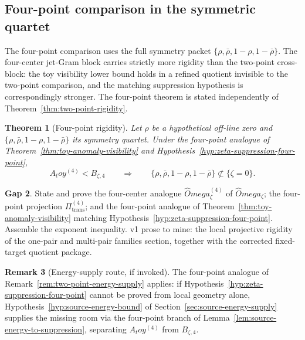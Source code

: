 \documentclass[11pt,a4paper]{amsart}
\def\Omega{Omega}%
\def\toy{toy}%
\numberwithin{equation}{section}
\theoremstyle{plain}
\newtheorem{theorem}{Theorem}[section]
\theoremstyle{definition}
\newtheorem{remark}[theorem]{Remark}
\newcommand{\z}{\zeta}
\newcommand{\Om}{\Omega}
\newcommand{\toy}{\mathrm{toy}}
\newcommand{\trans}{\mathrm{trans}}
\newtheorem{wip}[theorem]{Gap}
\begin{document}
\subsection{Four-point comparison in the symmetric quartet}
\label{subsec:four-point-comparison-symmetric-quartet}

The four-point comparison uses the full symmetry packet
\(\{\rho,\bar\rho,1-\rho,1-\bar\rho\}\).  The four-center jet-Gram block
carries strictly more rigidity than the two-point cross-block: the toy
visibility lower bound holds in a refined quotient invisible to the
two-point comparison, and the matching suppression hypothesis is
correspondingly stronger.  The four-point theorem is stated
independently of Theorem~\ref{thm:two-point-rigidity}.

\begin{theorem}[Four-point rigidity]
\label{thm:four-point-rigidity}
Let \(\rho\) be a hypothetical off-line zero and
\(\{\rho,\bar\rho,1-\rho,1-\bar\rho\}\) its symmetry quartet.  Under
the four-point analogue of Theorem~\ref{thm:toy-anomaly-visibility} and
Hypothesis~\ref{hyp:zeta-suppression-four-point},
\[
A_\toy^{(4)} < B_{\z,4} \qquad\Longrightarrow\qquad
\{\rho,\bar\rho,1-\rho,1-\bar\rho\}\not\subset\{\zeta=0\}.
\]
\end{theorem}

\begin{wip}\label{rem:wip-four-point-rigidity}
State and prove the four-center analogue \(\widehat\Om_\z^{(4)}\) of
\(\widehat\Om_\z\); the four-point projection \(\Pi_\trans^{(4)}\); and
the four-point analogue of Theorem~\ref{thm:toy-anomaly-visibility}
matching Hypothesis~\ref{hyp:zeta-suppression-four-point}.  Assemble
the exponent inequality.  v1 prose to mine: the local projective
rigidity of the one-pair and multi-pair families section, together
with the corrected fixed-target quotient package.
\end{wip}

\begin{remark}[Energy-supply route, if invoked]
\label{rem:four-point-energy-supply}
The four-point analogue of Remark~\ref{rem:two-point-energy-supply}
applies: if Hypothesis~\ref{hyp:zeta-suppression-four-point} cannot be
proved from local geometry alone,
Hypothesis~\ref{hyp:source-energy-bound} of
Section~\ref{sec:source-energy-supply} supplies the missing room
via the four-point branch of
Lemma~\ref{lem:source-energy-to-suppression}, separating
\(A_\toy^{(4)}\) from \(B_{\z,4}\).
\end{remark}
\end{document}
